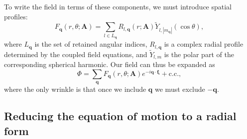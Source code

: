 \documentclass[11pt]{article}
\newcommand{\ON}[1]{ \textcolor{violet}{(ON: #1)} }
\begin{document}
To write the field in terms of these components, we must introduce spatial profiles:
\begin{equation}
    \label{eq:spatial_profile_Fq}
    F_\mathbf{q}(r,\theta;\mathbf{A}) = \sum_{l \in L_\mathbf{q}} R_{l,\mathbf{q}}(r;\mathbf{A}) \tilde{Y}_{l,|m_\mathbf{q}|}(\cos\theta),
\end{equation}
where $L_\mathbf{q}$ is the set of retained angular indices, $R_{l,\mathbf{q}}$ is a complex radial profile determined by the coupled field equations, and $\tilde{Y}_{l,m}$ is the polar part of the corresponding spherical harmonic. Our field can thus be expanded as
\begin{equation}
    \Phi = \sum_{\mathbf{q}} F_\mathbf{q}(r,\theta;\mathbf{A}) e^{-i \mathbf{q}\cdot\boldsymbol{\xi}} + \text{c.c.},
\end{equation}
where the only wrinkle is that once we include $\mathbf{q}$ we must exclude $-\mathbf{q}$.

\subsection{Reducing the equation of motion to a radial form}
\end{document}
